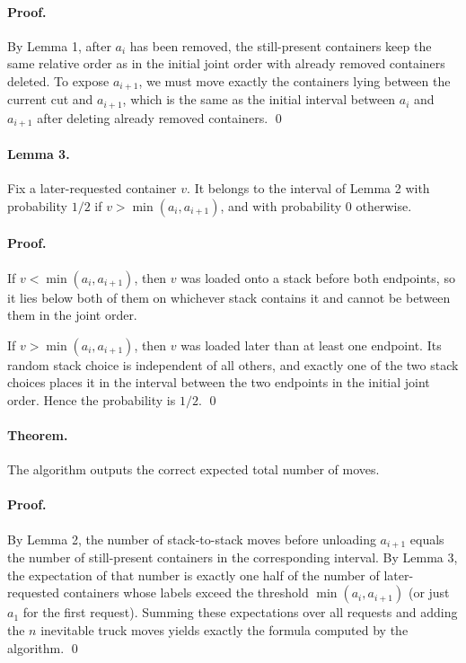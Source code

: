 \documentclass[11pt]{article}
\begin{document}
\paragraph{Proof.}
By Lemma 1, after $a_i$ has been removed, the still-present containers keep the same relative order as in
the initial joint order with already removed containers deleted. To expose $a_{i+1}$, we must move exactly
the containers lying between the current cut and $a_{i+1}$, which is the same as the initial interval
between $a_i$ and $a_{i+1}$ after deleting already removed containers. \qed

\paragraph{Lemma 3.}
Fix a later-requested container $v$. It belongs to the interval of Lemma 2 with probability $1/2$ if
$v > \min(a_i,a_{i+1})$, and with probability $0$ otherwise.

\paragraph{Proof.}
If $v < \min(a_i,a_{i+1})$, then $v$ was loaded onto a stack before both endpoints, so it lies below both
of them on whichever stack contains it and cannot be between them in the joint order.

If $v > \min(a_i,a_{i+1})$, then $v$ was loaded later than at least one endpoint. Its random stack choice is
independent of all others, and exactly one of the two stack choices places it in the interval between the
two endpoints in the initial joint order. Hence the probability is $1/2$. \qed

\paragraph{Theorem.}
The algorithm outputs the correct expected total number of moves.

\paragraph{Proof.}
By Lemma 2, the number of stack-to-stack moves before unloading $a_{i+1}$ equals the number of
still-present containers in the corresponding interval. By Lemma 3, the expectation of that number is
exactly one half of the number of later-requested containers whose labels exceed the threshold
$\min(a_i,a_{i+1})$ (or just $a_1$ for the first request). Summing these expectations over all requests and
adding the $n$ inevitable truck moves yields exactly the formula computed by the algorithm. \qed
\end{document}

